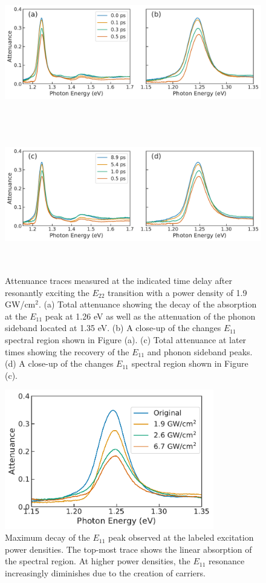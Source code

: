 \begin{figure}[H]%
	\centering
	{\includegraphics[height=2.4in]{images/chapter_my_data/Jan_CNT_ABS_1mW_decay} }
	{\includegraphics[height=2.4in]{images/chapter_my_data/Jan_CNT_ABS_1mW_recovery} }
	\caption{Attenuance traces measured at the indicated time delay after resonantly exciting the $E_{22}$ transition with a power density of 1.9 GW/cm$^2$. (a) Total attenuance showing the decay of the absorption at the $E_{11}$ peak at 1.26 eV as well as the attenuation of the phonon sideband located at 1.35 eV. (b) A close-up of the changes $E_{11}$ spectral region shown in Figure (a). (c) Total attenuance at later times showing the recovery of the $E_{11}$ and phonon sideband peaks. (d) A close-up of the changes $E_{11}$ spectral region shown in Figure (c).}
	\label{fig:jan_cnt_time_traces}
\end{figure}

\begin{figure}[ht]
	\centering
	\includegraphics[height=2.4in]{images/chapter_my_data/Jan_CNT_max_abs_change}
	\caption{Maximum decay of the $E_{11}$ peak observed at the labeled excitation power densities. The top-most trace shows the linear absorption of the spectral region. At higher power densities, the $E_{11}$ resonance increasingly diminishes due to the creation of carriers.}
	\label{fig:jan_cnt_max_decay}
\end{figure}

